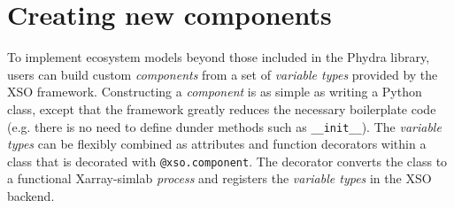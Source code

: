 \documentclass[journal abbreviation, manuscript]{copernicus}
\begin{document}




















\appendix


\section{Creating new components}  \label{Appendix:CreatingXSOComponent}

To implement ecosystem models beyond those included in the Phydra library, users can build custom \textit{components} from a set of \textit{variable types} provided by the XSO framework. Constructing a \textit{component} is as simple as writing a Python class, except that the framework greatly reduces the necessary boilerplate code (e.g. there is no need to define dunder methods such as \texttt{\_\_init\_\_}). The \textit{variable types} can be flexibly combined as attributes and function decorators within a class that is decorated with \texttt{@xso.component}. The decorator converts the class to a functional Xarray-simlab \textit{process} and registers the \textit{variable types} in the XSO backend.
\end{document}
